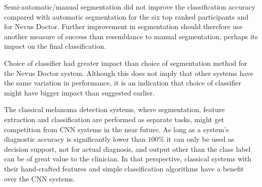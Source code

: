 \documentclass[a4paper,12pt]{article}
\begin{document}
Semi-automatic/manual segmentation did not improve the classification accuracy compared with automatic segmentation for the six top ranked participants and for Nevus Doctor. 
Further improvement in segmentation should therefore use another measure of success than resemblance to manual segmentation, perhaps its impact on the final classification.

Choice of classifier had greater impact than choice of segmentation method for the Nevus Doctor system. 
Although this does not imply that other systems have the same variation in performance, it is an indication that choice of classifier might have bigger impact than suggested earlier.  

The classical melanoma detection systems, where segmentation, feature extraction and classification are performed as separate tasks, might get competition from CNN systems in the near future.
As long as a system's diagnostic accuracy is significantly lower than $100\%$ it can only be used as decision support, not for actual diagnosis, and output other than the class label can be of great value to the clinician. 
In that perspective, classical systems with their hand-crafted features and simple classification algorithms have a benefit over the CNN systems. 








\end{document}
